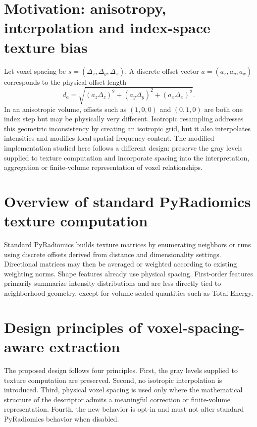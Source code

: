 \documentclass[11pt]{article}
\begin{document}
\section{Motivation: anisotropy, interpolation and index-space texture bias}
Let voxel spacing be \(s=(\Delta_z,\Delta_y,\Delta_x)\). A discrete offset vector \(a=(a_z,a_y,a_x)\) corresponds to the physical offset length
\begin{equation}
d_a = \sqrt{(a_z\Delta_z)^2 + (a_y\Delta_y)^2 + (a_x\Delta_x)^2}.
\end{equation}
In an anisotropic volume, offsets such as \((1,0,0)\) and \((0,1,0)\) are both one index step but may be physically very different. Isotropic resampling addresses this geometric inconsistency by creating an isotropic grid, but it also interpolates intensities and modifies local spatial-frequency content. The modified implementation studied here follows a different design: preserve the gray levels supplied to texture computation and incorporate spacing into the interpretation, aggregation or finite-volume representation of voxel relationships.

\section{Overview of standard PyRadiomics texture computation}
Standard PyRadiomics builds texture matrices by enumerating neighbors or runs using discrete offsets derived from distance and dimensionality settings. Directional matrices may then be averaged or weighted according to existing weighting norms. Shape features already use physical spacing. First-order features primarily summarize intensity distributions and are less directly tied to neighborhood geometry, except for volume-scaled quantities such as Total Energy.

\section{Design principles of voxel-spacing-aware extraction}
The proposed design follows four principles. First, the gray levels supplied to texture computation are preserved. Second, no isotropic interpolation is introduced. Third, physical voxel spacing is used only where the mathematical structure of the descriptor admits a meaningful correction or finite-volume representation. Fourth, the new behavior is opt-in and must not alter standard PyRadiomics behavior when disabled.
\end{document}
